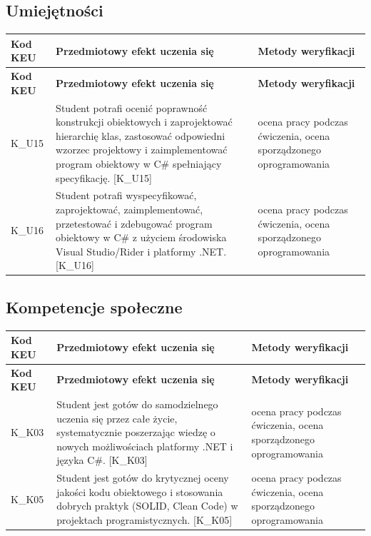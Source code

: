 \documentclass[12pt, a4paper]{article}
\newcommand{\thdrule}{\noalign{\global\setlength{\extrarowheight}{0pt}}}
\newcommand{\thdend}{\noalign{\global\setlength{\extrarowheight}{3pt}}}
\begin{document}
\subsection*{Umiejętności}
{\scriptsize
\begin{longtable}{m{1.6cm}m{9.0cm}m{4.2cm}}
\thdrule\toprule
\rowcolor{pjatkRed} {\color{white}\footnotesize\textbf{\vphantom{Ag}Kod KEU}} & {\color{white}\footnotesize\textbf{\vphantom{Ag}Przedmiotowy efekt uczenia się}} & {\color{white}\footnotesize\textbf{\vphantom{Ag}Metody weryfikacji}} \\
\midrule\thdend
\endfirsthead
\thdrule\toprule
\rowcolor{pjatkRed} {\color{white}\footnotesize\textbf{\vphantom{Ag}Kod KEU}} & {\color{white}\footnotesize\textbf{\vphantom{Ag}Przedmiotowy efekt uczenia się}} & {\color{white}\footnotesize\textbf{\vphantom{Ag}Metody weryfikacji}} \\
\midrule\thdend
\endhead
  \rowcolor{tableRowLight} K\_U15 & Student potrafi ocenić poprawność konstrukcji obiektowych i zaprojektować hierarchię klas, zastosować odpowiedni wzorzec projektowy i zaimplementować program obiektowy w C\# spełniający specyfikację. {[}K\_U15{]} & ocena pracy podczas ćwiczenia, ocena sporządzonego oprogramowania \\
  \rowcolor{tableRowAlt} K\_U16 & Student potrafi wyspecyfikować, zaprojektować, zaimplementować, przetestować i zdebugować program obiektowy w C\# z użyciem środowiska Visual Studio/Rider i platformy .NET. {[}K\_U16{]} & ocena pracy podczas ćwiczenia, ocena sporządzonego oprogramowania \\
\bottomrule
\end{longtable}}

\subsection*{Kompetencje społeczne}
{\scriptsize
\begin{longtable}{m{1.6cm}m{9.0cm}m{4.2cm}}
\thdrule\toprule
\rowcolor{pjatkRed} {\color{white}\footnotesize\textbf{\vphantom{Ag}Kod KEU}} & {\color{white}\footnotesize\textbf{\vphantom{Ag}Przedmiotowy efekt uczenia się}} & {\color{white}\footnotesize\textbf{\vphantom{Ag}Metody weryfikacji}} \\
\midrule\thdend
\endfirsthead
\thdrule\toprule
\rowcolor{pjatkRed} {\color{white}\footnotesize\textbf{\vphantom{Ag}Kod KEU}} & {\color{white}\footnotesize\textbf{\vphantom{Ag}Przedmiotowy efekt uczenia się}} & {\color{white}\footnotesize\textbf{\vphantom{Ag}Metody weryfikacji}} \\
\midrule\thdend
\endhead
  \rowcolor{tableRowLight} K\_K03 & Student jest gotów do samodzielnego uczenia się przez całe życie, systematycznie poszerzając wiedzę o nowych możliwościach platformy .NET i języka C\#. {[}K\_K03{]} & ocena pracy podczas ćwiczenia, ocena sporządzonego oprogramowania \\
  \rowcolor{tableRowAlt} K\_K05 & Student jest gotów do krytycznej oceny jakości kodu obiektowego i stosowania dobrych praktyk (SOLID, Clean Code) w projektach programistycznych. {[}K\_K05{]} & ocena pracy podczas ćwiczenia, ocena sporządzonego oprogramowania \\
\bottomrule
\end{longtable}}
\end{document}
